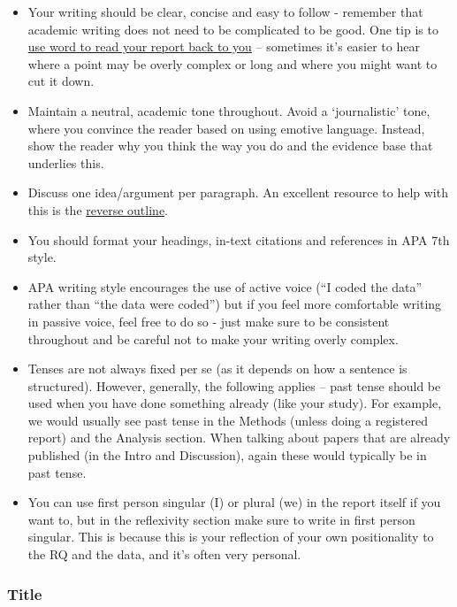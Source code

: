 \documentclass[
  english,
  letterpaper,
  DIV=11,
  numbers=noendperiod]{scrreprt}
\begin{document}
\begin{itemize}
\item
  Your writing should be clear, concise and easy to follow - remember
  that academic writing does not need to be complicated to be good. One
  tip is to
  \href{https://support.microsoft.com/en-gb/office/listen-to-your-word-documents-5a2de7f3-1ef4-4795-b24e-64fc2731b001}{use
  word to read your report back to you} -- sometimes it's easier to hear
  where a point may be overly complex or long and where you might want
  to cut it down.
\item
  Maintain a neutral, academic tone throughout. Avoid a `journalistic'
  tone, where you convince the reader based on using emotive language.
  Instead, show the reader why you think the way you do and the evidence
  base that underlies this.
\item
  Discuss one idea/argument per paragraph. An excellent resource to help
  with this is the
  \href{https://explorationsofstyle.com/2011/02/09/reverse-outlines/}{reverse
  outline}.
\item
  You should format your headings, in-text citations and references in
  APA 7th style.
\item
  APA writing style encourages the use of active voice (``I coded the
  data'' rather than ``the data were coded'') but if you feel more
  comfortable writing in passive voice, feel free to do so - just make
  sure to be consistent throughout and be careful not to make your
  writing overly complex.
\item
  Tenses are not always fixed per se (as it depends on how a sentence is
  structured). However, generally, the following applies -- past tense
  should be used when you have done something already (like your study).
  For example, we would usually see past tense in the Methods (unless
  doing a registered report) and the Analysis section. When talking
  about papers that are already published (in the Intro and Discussion),
  again these would typically be in past tense.
\item
  You can use first person singular (I) or plural (we) in the report
  itself if you want to, but in the reflexivity section make sure to
  write in first person singular. This is because this is your
  reflection of your own positionality to the RQ and the data, and it's
  often very personal.
\end{itemize}

\subsubsection{Title}\label{title}
\end{document}
